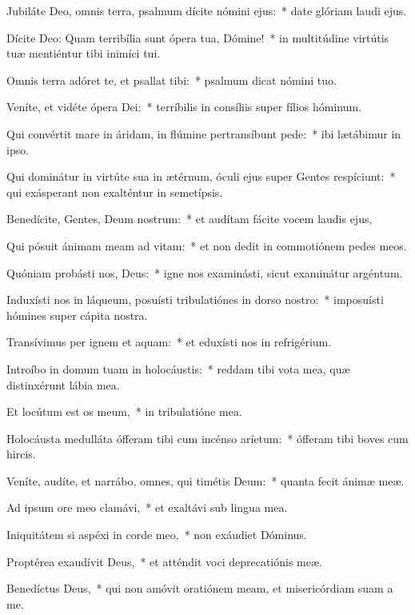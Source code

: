 \item Jubiláte Deo, omnis terra, psalmum dícite nómini ejus:~* date glóriam laudi ejus.

\item Dícite Deo: Quam terribília sunt ópera tua, Dómine!~* in multitúdine virtútis tuæ mentiéntur tibi inimíci tui.

\item Omnis terra adóret te, et psallat tibi:~* psalmum dicat nómini tuo.

\item Veníte, et vidéte ópera Dei:~* terríbilis in consíliis super fílios hóminum.

\item Qui convértit mare in áridam, in flúmine pertransíbunt pede:~* ibi lætábimur in ipso.

\item Qui dominátur in virtúte sua in ætérnum, óculi ejus super Gentes respíciunt:~* qui exásperant non exalténtur in semetípsis.

\item Benedícite, Gentes, Deum nostrum:~* et audítam fácite vocem laudis ejus,

\item Qui pósuit ánimam meam ad vitam:~* et non dedit in commotiónem pedes meos.

\item Quóniam probásti nos, Deus:~* igne nos examinásti, sicut examinátur argéntum.

\item Induxísti nos in láqueum, posuísti tribulatiónes in dorso nostro:~* imposuísti hómines super cápita nostra.

\item Transívimus per ignem et aquam:~* et eduxísti nos in refrigérium.

\item Introíbo in domum tuam in holocáustis:~* reddam tibi vota mea, quæ distinxérunt lábia mea.

\item Et locútum est os meum,~* in tribulatióne mea.

\item Holocáusta medulláta ófferam tibi cum incénso aríetum:~* ófferam tibi boves cum hircis.

\item Veníte, audíte, et narrábo, omnes, qui timétis Deum:~* quanta fecit ánimæ meæ.

\item Ad ipsum ore meo clamávi,~* et exaltávi sub lingua mea.

\item Iniquitátem si aspéxi in corde meo,~* non exáudiet Dóminus.

\item Proptérea exaudívit Deus,~* et atténdit voci deprecatiónis meæ.

\item Benedíctus Deus,~* qui non amóvit oratiónem meam, et misericórdiam suam a me.


